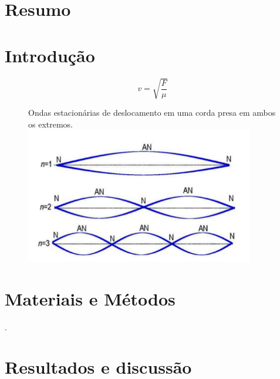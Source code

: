 \documentclass[a4paper, 12pt]{article}
\begin{document}
\justifying

\section{Resumo}  %
\section{Introdução}
    

\begin{equation}
\label{eq:corda}
v = \sqrt{\frac{F}{\mu }}
\end{equation}
    
\begin{figure}[H]
\centering
\caption{}{Ondas estacionárias de deslocamento em uma corda presa em
ambos os extremos.}
\includegraphics[width=10.0cm]{ondas_estacionarias.png}
\label{fig:ondas_estacionarias}  
\cite{lab}
\end{figure}

\section{Materiais e Métodos}.
\section{Resultados e discussão}

\vspace{0.75cm} %


\vspace{0.75cm} %

\begin{table}[H] %
\caption{ Tabela relacionando os harmônicos com seus $f$ e suas $\lambda$}
\begin{center}
\end{center}
\end{table}
\end{document}
